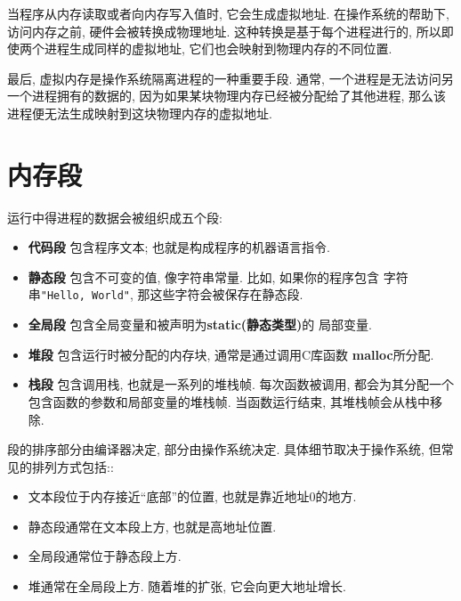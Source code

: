 \documentclass[12pt]{book}
\begin{document}
{当程序从内存读取或者向内存写入值时, 它会生成虚拟地址.
在操作系统的帮助下, 访问内存之前, 硬件会被转换成物理地址.
这种转换是基于每个进程进行的, 所以即使两个进程生成同样的虚拟地址,
它们也会映射到物理内存的不同位置.

最后, 虚拟内存是操作系统隔离进程的一种重要手段.
通常, 一个进程是无法访问另一个进程拥有的数据的, 
因为如果某块物理内存已经被分配给了其他进程,
那么该进程便无法生成映射到这块物理内存的虚拟地址.


\section{内存段}

运行中得进程的数据会被组织成五个段:

\begin{itemize}

\item {\bf 代码段} 包含程序文本; 也就是构成程序的机器语言指令.

\item {\bf 静态段} 包含不可变的值, 像字符串常量. 比如, 如果你的程序包含
字符串{\tt "Hello, World"}, 那这些字符会被保存在静态段.

\item {\bf 全局段} 包含全局变量和被声明为{\bf static(静态类型)}的
局部变量.

\item {\bf 堆段} 包含运行时被分配的内存块, 通常是通过调用C库函数
{\bf malloc}所分配.

\item {\bf 栈段} 包含调用栈, 也就是一系列的堆栈帧.
每次函数被调用, 都会为其分配一个包含函数的参数和局部变量的堆栈帧.
当函数运行结束, 其堆栈帧会从栈中移除. 

\end{itemize}

段的排序部分由编译器决定, 部分由操作系统决定.
具体细节取决于操作系统, 但常见的排列方式包括::

\begin{itemize}

\item 文本段位于内存接近``底部''的位置, 也就是靠近地址0的地方.

\item 静态段通常在文本段上方, 也就是高地址位置.

\item 全局段通常位于静态段上方.

\item 堆通常在全局段上方. 随着堆的扩张, 它会向更大地址增长.
  

\end{itemize}}
\end{document}
